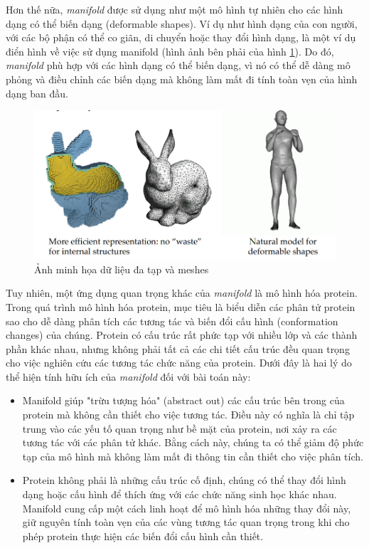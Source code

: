 Hơn thế nữa, \textit{manifold} được sử dụng như một mô hình tự nhiên cho các hình dạng có thể biến dạng (deformable shapes)\cite{geometricdeep2022}. Ví dụ như hình dạng của con người, với các bộ phận có thể co giãn, di chuyển hoặc thay đổi hình dạng, là một ví dụ điển hình về việc sử dụng manifold (hình ảnh bên phải của hình \ref{fig:why-mani}). Do đó, \textit{manifold} phù hợp với các hình dạng có thể biến dạng, vì nó có thể dễ dàng mô phỏng và điều chỉnh các biến dạng mà không làm mất đi tính toàn vẹn của hình dạng ban đầu\cite{geometricdeep2022}.

\begin{figure}[H]
    \centering
    \includegraphics[width=0.8\linewidth]{Images/GDL/manifold_mesh/why_mani.png}
    \caption{Ảnh minh họa dữ liệu đa tạp và meshes\cite{geometricdeep2022}}
    \label{fig:why-mani}
\end{figure}

Tuy nhiên, một ứng dụng quan trọng khác của \textit{manifold} là mô hình hóa protein. Trong quá trình mô hình hóa protein, mục tiêu là biểu diễn các phân tử protein sao cho dễ dàng phân tích các tương tác và biến đổi cấu hình (conformation changes) của chúng. Protein có cấu trúc rất phức tạp với nhiều lớp và các thành phần khác nhau, nhưng không phải tất cả các chi tiết cấu trúc đều quan trọng cho việc nghiên cứu các tương tác chức năng của protein. Dưới đây là hai lý do thể hiện tính hữu ích của \textit{manifold} đối với bài toán này:

\begin{itemize}
    \item Manifold giúp "trừu tượng hóa" (abstract out) các cấu trúc bên trong của protein mà không cần thiết cho việc tương tác. Điều này có nghĩa là chỉ tập trung vào các yếu tố quan trọng như bề mặt của protein, nơi xảy ra các tương tác với các phân tử khác\cite{geometricdeep2022}. Bằng cách này, chúng ta có thể giảm độ phức tạp của mô hình mà không làm mất đi thông tin cần thiết cho việc phân tích.

    \item Protein không phải là những cấu trúc cố định, chúng có thể thay đổi hình dạng hoặc cấu hình để thích ứng với các chức năng sinh học khác nhau. Manifold cung cấp một cách linh hoạt để mô hình hóa những thay đổi này, giữ nguyên tính toàn vẹn của các vùng tương tác quan trọng trong khi cho phép protein thực hiện các biến đổi cấu hình cần thiết\cite{geometricdeep2022}.
\end{itemize}


